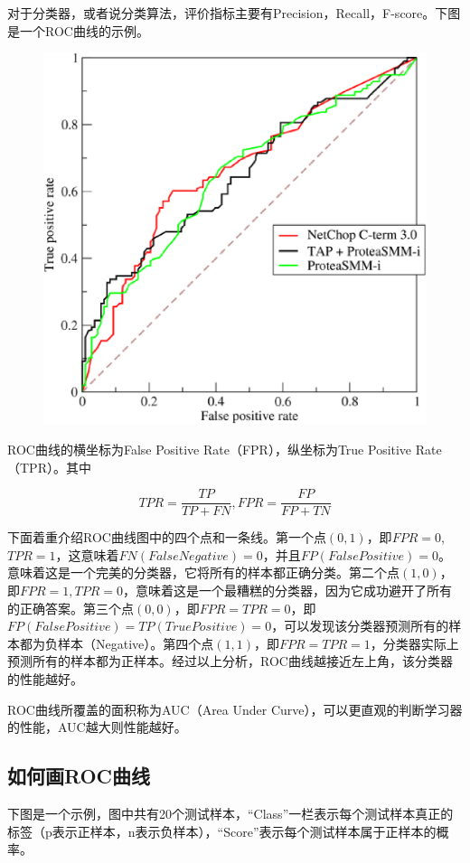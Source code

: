 对于分类器，或者说分类算法，评价指标主要有Precision，Recall，F-score。下图是一个ROC曲线的示例。

 \begin{figure}[h]
   \centering
   \includegraphics[width=.7\textwidth]{imgs/2.40.10.1.eps}
   \label{fig:2.40.10.1}
 \end{figure}

ROC曲线的横坐标为False Positive Rate（FPR），纵坐标为True Positive Rate（TPR）。其中

$$
TPR = \frac{TP}{TP+FN} ,FPR = \frac{FP}{FP+TN}
$$

下面着重介绍ROC曲线图中的四个点和一条线。第一个点$(0,1)$，即$FPR=0$, $TPR=1$，这意味着$FN(False Negative)=0$，并且$FP(False Positive)=0$。意味着这是一个完美的分类器，它将所有的样本都正确分类。第二个点$(1,0)$，即$FPR=1,TPR=0$，意味着这是一个最糟糕的分类器，因为它成功避开了所有的正确答案。第三个点$(0,0)$，即$FPR=TPR=0$，即$FP(False Positive)=TP(True Positive)=0$，可以发现该分类器预测所有的样本都为负样本（Negative）。第四个点$(1,1)$，即$FPR=TPR=1$，分类器实际上预测所有的样本都为正样本。经过以上分析，ROC曲线越接近左上角，该分类器的性能越好。

ROC曲线所覆盖的面积称为AUC（Area Under Curve），可以更直观的判断学习器的性能，AUC越大则性能越好。  

\subsection{如何画ROC曲线}

下图是一个示例，图中共有20个测试样本，“Class”一栏表示每个测试样本真正的标签（p表示正样本，n表示负样本），“Score”表示每个测试样本属于正样本的概率。

